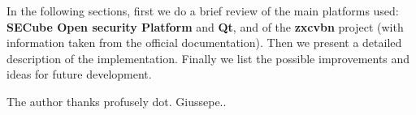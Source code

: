 \documentclass[%
    corpo=13pt,
    twoside,
    oldstyle,
    autoretitolo,
    greek,
    evenboxes,
]{toptesi}
\begin{document}
In the following sections, first we do a brief review of the main platforms used: \textbf{SECube Open security Platform} and \textbf{Qt}, and of the \textbf{zxcvbn} project (with information taken from the official documentation). Then we present a detailed description of the implementation. Finally we list the possible improvements and ideas for future development.

\ringraziamenti

The author thanks profusely dot. Giussepe..

\indici

\mainmatter




\end{document}
